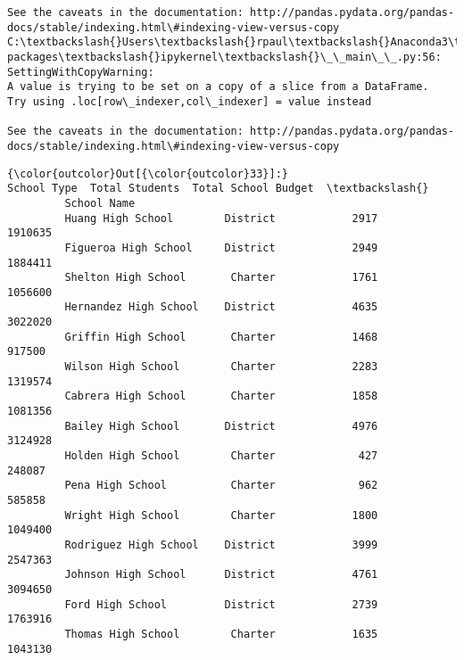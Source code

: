 \documentclass[11pt]{article}
\begin{document}
\begin{Verbatim}[commandchars=\\\{\}]
See the caveats in the documentation: http://pandas.pydata.org/pandas-docs/stable/indexing.html\#indexing-view-versus-copy
C:\textbackslash{}Users\textbackslash{}rpaul\textbackslash{}Anaconda3\textbackslash{}lib\textbackslash{}site-packages\textbackslash{}ipykernel\textbackslash{}\_\_main\_\_.py:56: SettingWithCopyWarning: 
A value is trying to be set on a copy of a slice from a DataFrame.
Try using .loc[row\_indexer,col\_indexer] = value instead

See the caveats in the documentation: http://pandas.pydata.org/pandas-docs/stable/indexing.html\#indexing-view-versus-copy

    \end{Verbatim}

\begin{Verbatim}[commandchars=\\\{\}]
{\color{outcolor}Out[{\color{outcolor}33}]:}                       School Type  Total Students  Total School Budget  \textbackslash{}
         School Name                                                              
         Huang High School        District            2917              1910635   
         Figueroa High School     District            2949              1884411   
         Shelton High School       Charter            1761              1056600   
         Hernandez High School    District            4635              3022020   
         Griffin High School       Charter            1468               917500   
         Wilson High School        Charter            2283              1319574   
         Cabrera High School       Charter            1858              1081356   
         Bailey High School       District            4976              3124928   
         Holden High School        Charter             427               248087   
         Pena High School          Charter             962               585858   
         Wright High School        Charter            1800              1049400   
         Rodriguez High School    District            3999              2547363   
         Johnson High School      District            4761              3094650   
         Ford High School         District            2739              1763916   
         Thomas High School        Charter            1635              1043130   
         

\end{Verbatim}
\end{document}

